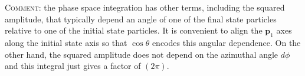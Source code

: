 \documentclass[12pt]{article}
\renewcommand{\vec}[1]{\mathbf{#1}} %
\begin{document}
\textsc{Comment:} the phase space integration has other terms, including the squared amplitude, that typically depend an angle of one of the final state particles relative to one of the initial state particles. It is convenient to align the $\vec{p}_1$ axes along the initial state axis so that $\cos\theta$ encodes this angular dependence. On the other hand, the squared amplitude does not depend on the azimuthal angle $d\phi$ and this integral just gives a factor of $(2\pi)$.










\end{document}

